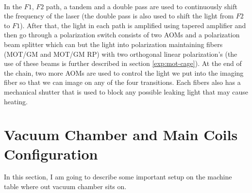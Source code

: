 \\
In the $F1$, $F2$ path, a tandem and a double pass are used to continuously shift the frequency of the laser (the double pass is also used to shift the light from $F2$ to $F1$). After that, the light in each path is amplified using tapered amplifier and then go through a polarization switch consists of two AOMs and a polarization beam splitter which can but the light into polarization maintaining fibers (MOT/GM and MOT/GM RP) with two orthogonal linear polarization's (the use of these beams is further described in section \ref{exp:mot-cage}). At the end of the chain, two more AOMs are used to control the light we put into the imaging fiber so that we can image on any of the four transitions. Each fibers also has a mechanical shutter that is used to block any possible leaking light that may cause heating.

\section{Vacuum Chamber and Main Coils Configuration}\label{exp:machine-table}

In this section, I am going to describe some important setup on the machine table where out vacuum chamber sits on.

